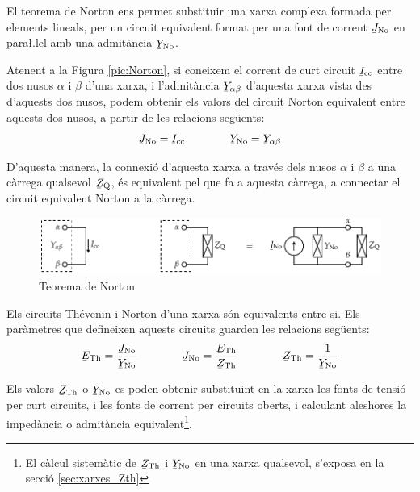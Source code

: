 El teorema de Norton ens permet substituir
una xarxa complexa formada per elements lineals, per un circuit
equivalent format per una font de corrent $\cmplx{J}\ped{No}$ en
para{\l.l}el amb una admit\`{a}ncia $\cmplx{Y}\ped{No}$.

Atenent a la Figura \vref{pic:Norton}, si coneixem el corrent de
curt circuit $\cmplx{I}\ped{cc}$ entre dos nusos $\alpha$ i $\beta$
d'una xarxa, i l'admit\`{a}ncia $\cmplx{Y}_{\alpha\beta}$ d'aquesta
xarxa vista des d'aquests dos nusos, podem obtenir els valors del
circuit Norton equivalent entre aquests dos nusos, a partir de les
relacions seg\"{u}ents:
\begin{equation}
   \cmplx{J}\ped{No} = \cmplx{I}\ped{cc} \qquad\qquad \cmplx{Y}\ped{No} = \cmplx{Y}_{\alpha\beta}
\end{equation}

D'aquesta manera, la connexi\'{o} d'aquesta xarxa a trav\'{e}s dels nusos
$\alpha$ i $\beta$ a una c\`{a}rrega qualsevol $\cmplx{Z}\ped{Q}$, \'{e}s
equivalent pel que fa a aquesta c\`{a}rrega, a connectar el circuit
equivalent Norton a la c\`{a}rrega.
\begin{figure}[h]
\centering
    \includegraphics{Imatges/Cap-Fonaments-Norton.pdf}
\caption{Teorema de Norton} \label{pic:Norton}
\end{figure}

Els circuits Th\'{e}venin i Norton d'una xarxa s\'{o}n equivalents entre si.
Els par\`{a}metres que defineixen aquests circuits guarden les relacions
seg\"{u}ents:
\begin{equation}\label{eq:Thevenin-Norton}
   \cmplx{E}\ped{Th} = \frac{\cmplx{J}\ped{No}}{\cmplx{Y}\ped{No}} \qquad\qquad
   \cmplx{J}\ped{No} = \frac{\cmplx{E}\ped{Th}}{\cmplx{Z}\ped{Th}} \qquad\qquad
    \cmplx{Z}\ped{Th} = \frac{1}{\cmplx{Y}\ped{No}}
\end{equation}

Els valors $\cmplx{Z}\ped{Th}$ o  $\cmplx{Y}\ped{No}$ es poden
obtenir substituint en la xarxa  les fonts de tensi\'{o}  per curt
circuits, i les fonts de corrent per circuits oberts, i calculant
aleshores la imped\`{a}ncia o admit\`{a}ncia equivalent\footnote{El c\`{a}lcul sistem\`{a}tic de $\cmplx{Z}\ped{Th}$ i  $\cmplx{Y}\ped{No}$ en una xarxa qualsevol, s'exposa en la secci\'{o} \ref{sec:xarxes_Zth}}.

